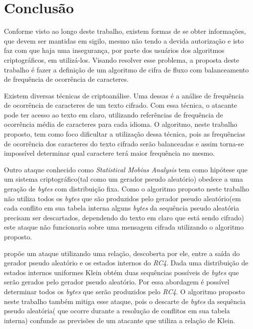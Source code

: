 \chapter{Conclusão}
\label{conclusion}


Conforme visto ao longo deste trabalho, existem formas de se obter informações, que devem ser mantidas em sigilo, mesmo não tendo a devida autorização e isto faz com que haja uma insegurança, por parte dos usuários dos algoritmos criptográficos, em utilizá-los. Visando resolver esse problema, a proposta deste trabalho é fazer a definição de um algoritmo de cifra de fluxo com balanceamento de frequência de ocorrência de caracteres.

Existem diversas técnicas de criptoanálise. Uma dessas é a análise de frequência de ocorrência de caracteres de um texto cifrado. Com essa técnica, o atacante pode ter acesso ao texto em claro, utilizando referências de frequência de ocorrência média de caracteres para cada idioma. O algoritmo, neste trabalho proposto, tem como foco dificultar a utilização dessa técnica, pois as frequências de ocorrência dos caracteres do texto cifrado serão balanceadas e assim torna-se impossível determinar qual caractere terá maior frequência no mesmo.

Outro ataque conhecido como \textit{Statistical Mobius Analysis} tem como hipótese  que um sistema criptográfico(tal como um gerador pseudo aleatório) obedece a uma geração de \textit{bytes} com distribuição fixa\cite{eric-filiol}. Como o algoritmo proposto neste trabalho não utiliza todos os \textit{bytes} que são produzidos pelo gerador pseudo aleatório(em cada conflito em sua tabela interna alguns \textit{bytes} da sequência pseudo aleatória precisam ser descartados, dependendo do texto em claro que está sendo cifrado) este ataque não funcionaria sobre uma mensagem cifrada utilizando o algoritmo proposto.

\cite[*]{andreas-klein} propõe um ataque utilizando uma relação, descoberta por ele, entre a saída do gerador pseudo aleatório e os estados internos do \textit{RC4}. Dada uma distribuição de estados internos uniformes Klein obtém duas sequências possíveis de \textit{bytes} que serão gerados pelo gerador pseudo aleatório. Por essa abordagem é possível determinar todos os \textit{bytes} que serão produzidos pelo \textit{RC4}. O algoritmo proposto neste trabalho também mitiga esse ataque, pois o descarte de \textit{bytes} da sequência pseudo aleatória( que ocorre durante a resolução de conflitos em sua tabela interna) confunde as previsões de um atacante que utiliza a relação de Klein.
 
